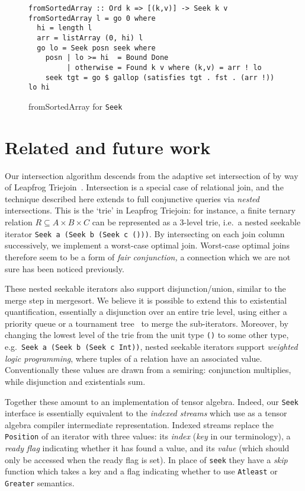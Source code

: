 \documentclass[acmsmall,screen,dvipsnames,svgnames]{acmart}
\newcommand\hask[1]{\texttt{#1}}
\newcommand\ttt\texttt
\newcommand\todo[1]{{\color{Orange}#1}}
\renewcommand\todo[1]{{\color{IndianRed}#1}}
\newcommand\oldtodo[1]{\todo{#1}}
\renewcommand\todo[1]{\ignorespaces}
\begin{document}
\begin{figure}
  \begin{verbatim}
fromSortedArray :: Ord k => [(k,v)] -> Seek k v
fromSortedArray l = go 0 where
  hi = length l
  arr = listArray (0, hi) l
  go lo = Seek posn seek where
    posn | lo >= hi  = Bound Done
         | otherwise = Found k v where (k,v) = arr ! lo
    seek tgt = go $ gallop (satisfies tgt . fst . (arr !)) lo hi
  \end{verbatim}
  \caption{fromSortedArray for \hask{Seek}}
  \label{fig:seek-fromsortedarray}
\end{figure}


\section{Related and future work}

Our intersection algorithm descends from the adaptive set intersection of \citet{DBLP:conf/soda/DemaineLM00} by way of Leapfrog Triejoin~\citep{lftj}.
%
Intersection is a special case of relational join, and the technique described here extends to full conjunctive queries via \emph{nested} intersections.
This is the `trie' in Leapfrog Triejoin: for instance, a finite ternary relation $R \subseteq A \times B \times C$ can be represented as a 3-level trie, i.e.\ a nested seekable iterator \hask{Seek a (Seek b (Seek c ()))}.
By intersecting on each join column successively, we implement a worst-case optimal join.
Worst-case optimal joins therefore seem to be a form of \emph{fair conjunction,} a connection which we are not sure has been noticed previously.

These nested seekable iterators also support disjunction/union, similar to the merge step in mergesort.
We believe it is possible to extend this to existential quantification, essentially a disjunction over an entire trie level, using either a priority queue or a tournament tree~\citep[Chapter 5.4.1]{DBLP:books/lib/Knuth98a} to merge the sub-iterators.
Moreover, by changing the lowest level of the trie from the unit type \ttt{()} to some other type, e.g.\ \hask{Seek a (Seek b (Seek c Int))}, nested seekable iterators support \emph{weighted logic programming}, where tuples of a relation have an associated value.
Conventionally these values are drawn from a semiring: conjunction multiplies, while disjunction and existentials sum.

Together these amount to an implementation of tensor algebra.
Indeed, our \hask{Seek} interface is essentially equivalent to the \emph{indexed streams} which \citet{indexed-streams} use as a tensor algebra compiler intermediate representation.
Indexed streams replace the \hask{Position} of an iterator with three values: its \emph{index} (\emph{key} in our terminology), a \emph{ready flag} indicating whether it has found a value, and its \emph{value} (which should only be accessed when the ready flag is set).
In place of \hask{seek} they have a \emph{skip} function which takes a key and a flag indicating whether to use \hask{Atleast} or \hask{Greater} semantics.
\oldtodo{all their key/index types are bounded so they don't need \hask{Done}---is this accurate?}
\end{document}
